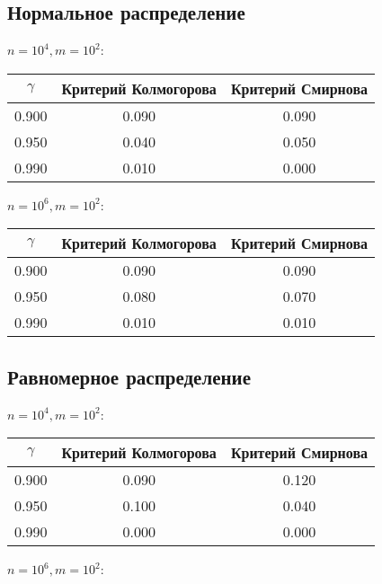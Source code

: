 \documentclass[12pt, a4paper]{article}
\begin{document}
\subsection{Нормальное распределение}

$n = 10^4, m = 10^2$:
\begin{center}
    \begin{tabular}{|c|c|c|}
         \hline \boldmath$\gamma$ & \textbf{Критерий Колмогорова} & \textbf{Критерий Смирнова} \\
         \hline 0.900 & 0.090 & 0.090 \\
         \hline 0.950 & 0.040 & 0.050 \\
         \hline 0.990 & 0.010 & 0.000 \\
         \hline
    \end{tabular}
\end{center}

$n = 10^6, m = 10^2$:

\begin{center}
    \begin{tabular}{|c|c|c|}
         \hline \boldmath$\gamma$ & \textbf{Критерий Колмогорова} & \textbf{Критерий Смирнова} \\
         \hline 0.900 & 0.090 & 0.090 \\
         \hline 0.950 & 0.080 & 0.070  \\
         \hline 0.990 & 0.010 & 0.010 \\
         \hline
    \end{tabular}
\end{center}

\subsection{Равномерное распределение}

$n = 10^4, m = 10^2$:
\begin{center}
    \begin{tabular}{|c|c|c|}
         \hline \boldmath$\gamma$ & \textbf{Критерий Колмогорова} & \textbf{Критерий Смирнова} \\
         \hline 0.900&0.090&0.120 \\
         \hline 0.950&0.100&0.040 \\
         \hline 0.990&0.000&0.000 \\
         \hline
    \end{tabular}
\end{center}

$n = 10^6, m = 10^2$:
\end{document}
